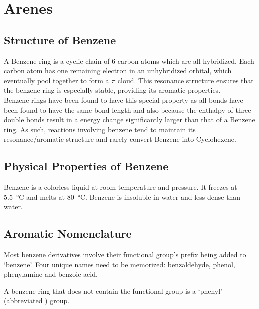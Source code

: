 \documentclass[../main]{subfiles}
\begin{document}
\section{Arenes}

	\subsection{Structure of Benzene}

	A Benzene ring is a cyclic chain of 6 carbon atoms which are all  hybridized. Each carbon atom has one remaining electron in an unhybridized  orbital, which eventually pool together to form a \(\pi\)  cloud. This resonance structure ensures that the benzene ring is especially stable, providing its aromatic properties. \\

	Benzene rings have been found to have this special property as all  bonds have been found to have the same bond length and also because the enthalpy of three  double bonds result in a energy change significantly larger than that of a Benzene ring. As such, reactions involving benzene tend to maintain its resonance/aromatic structure and rarely convert Benzene into Cyclohexene.

	\subsection{Physical Properties of Benzene}

	Benzene is a colorless liquid at room temperature and pressure. It freezes at \SI{5.5}{\celsius} and melts at \SI{80}{\celsius}. Benzene is insoluble in water and less dense than water.

	\subsection{Aromatic Nomenclature}

	Most benzene derivatives involve their functional group's prefix being added to `benzene'. Four unique names need to be memorized: benzaldehyde, phenol, phenylamine and benzoic acid.

	\begin{center}
	\end{center}

	A benzene ring that does not contain the functional group is a `phenyl' (abbreviated ) group.
\end{document}
